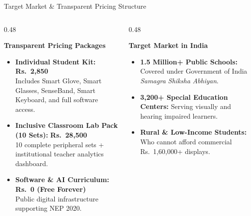 \documentclass[aspectratio=169,10pt]{beamer}
\begin{document}
\begin{frame}{Target Market \& Transparent Pricing Structure}
    \begin{columns}[T]
        \begin{column}{0.48\textwidth}
            \begin{block}{\textbf{Transparent Pricing Packages}}
                \begin{itemize}
                    \item \textbf{Individual Student Kit:} \textbf{Rs.~2,850}\\
                    Includes Smart Glove, Smart Glasses, SenseBand, Smart Keyboard, and full software access.
                    \item \textbf{Inclusive Classroom Lab Pack (10 Sets):} \textbf{Rs.~28,500}\\
                    10 complete peripheral sets + institutional teacher analytics dashboard.
                    \item \textbf{Software \& AI Curriculum:} \textbf{Rs.~0 (Free Forever)}\\
                    Public digital infrastructure supporting NEP 2020.
                \end{itemize}
            \end{block}
        \end{column}
        \begin{column}{0.48\textwidth}
            \begin{block}{\textbf{Target Market in India}}
                \begin{itemize}
                    \item \textbf{1.5 Million+ Public Schools:} Covered under Government of India \textit{Samagra Shiksha Abhiyan}.
                    \item \textbf{3,200+ Special Education Centers:} Serving visually and hearing impaired learners.
                    \item \textbf{Rural \& Low-Income Students:} Who cannot afford commercial Rs.~1,60,000+ displays.
                \end{itemize}
            \end{block}
        \end{column}
    \end{columns}
\end{frame}
\end{document}
